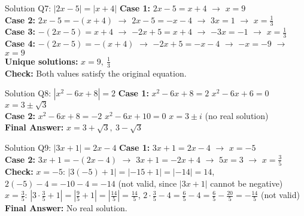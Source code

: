 \documentclass[aspectratio=169]{beamer}
\begin{document}
\begin{frame}{Solution Q7: $|2x-5| = |x+4|$}
    \footnotesize
    \textbf{Case 1:} $2x-5 = x+4$ $\rightarrow$ $x=9$\\
    \textbf{Case 2:} $2x-5 = -(x+4)$ $\rightarrow$ $2x-5 = -x-4$ $\rightarrow$ $3x = 1$ $\rightarrow$ $x=\frac{1}{3}$\\
    \textbf{Case 3:} $-(2x-5) = x+4$ $\rightarrow$ $-2x+5 = x+4$ $\rightarrow$ $-3x = -1$ $\rightarrow$ $x=\frac{1}{3}$\\
    \textbf{Case 4:} $-(2x-5) = -(x+4)$ $\rightarrow$ $-2x+5 = -x-4$ $\rightarrow$ $-x = -9$ $\rightarrow$ $x=9$\\
    \textbf{Unique solutions:} $x=9,\ \frac{1}{3}$\\
    \textbf{Check:} Both values satisfy the original equation.
\end{frame}

\begin{frame}{Solution Q8: $|x^2-6x+8| = 2$}
    \footnotesize
    \textbf{Case 1:} $x^2-6x+8 = 2$ \rightarrow $x^2-6x+6=0$ \rightarrow $x=3\pm\sqrt{3}$\\
    \textbf{Case 2:} $x^2-6x+8 = -2$ \rightarrow $x^2-6x+10=0$ \rightarrow $x=3\pm i$ (no real solution)\\
    \textbf{Final Answer:} $x=3+\sqrt{3},\ 3-\sqrt{3}$
\end{frame}

\begin{frame}{Solution Q9: $|3x+1| = 2x-4$}
    \footnotesize
    \textbf{Case 1:} $3x+1 = 2x-4$ $\rightarrow$ $x=-5$\\
    \textbf{Case 2:} $3x+1 = -(2x-4)$ $\rightarrow$ $3x+1 = -2x+4$ $\rightarrow$ $5x=3$ $\rightarrow$ $x=\frac{3}{5}$\\
    \textbf{Check:} $x=-5$: $|3(-5)+1| = |-15+1| = |-14| = 14$, $2(-5)-4 = -10-4 = -14$ (not valid, since $|3x+1|$ cannot be negative)\\
    $x=\frac{3}{5}$: $|3\cdot\frac{3}{5}+1| = |\frac{9}{5}+1| = |\frac{14}{5}| = \frac{14}{5}$, $2\cdot\frac{3}{5}-4 = \frac{6}{5}-4 = \frac{6}{5}-\frac{20}{5} = -\frac{14}{5}$ (not valid)\\
    \textbf{Final Answer:} No real solution.
\end{frame}
\end{document}
